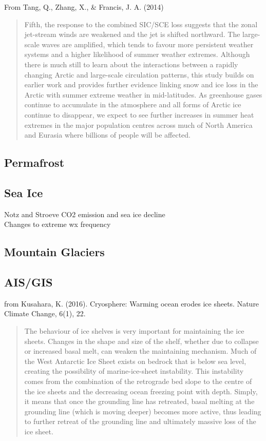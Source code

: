 \documentclass[amstex,12pt]{book}
\begin{document}
From Tang, Q., Zhang, X., \& Francis, J. A. (2014) 
\begin{quotation}
	Fifth, the response to the combined SIC/SCE loss suggests that the zonal jet-stream winds are weakened and the jet is shifted northward. The large-scale waves are amplified, which tends to favour more persistent weather systems and a higher likelihood of summer weather extremes. Although there is much still to learn about the interactions between a rapidly changing Arctic and large-scale circulation patterns, this study builds on earlier work and provides further evidence linking snow and ice loss in the Arctic with summer extreme weather in mid-latitudes. As greenhouse gases continue to accumulate in the atmosphere and all forms of Arctic ice continue to disappear, we expect to see further increases in summer heat extremes in the major population centres across much of North America and Eurasia where billions of people will be affected.
\end{quotation}


\subsection{Permafrost}
\subsection{Sea Ice}
Notz and Stroeve CO2 emission and sea ice decline\\
Changes to extreme wx frequency\\
\subsection{Mountain Glaciers}
\subsection{AIS/GIS}
from Kusahara, K. (2016). Cryosphere: Warming ocean erodes ice sheets. Nature Climate Change, 6(1), 22. \begin{quotation}
	The behaviour of ice shelves is very important for maintaining the ice sheets. Changes in the shape and size of the shelf, whether due to collapse or increased basal melt, can weaken the maintaining mechanism. Much of the West Antarctic Ice Sheet exists on bedrock that is below sea level, creating the possibility of marine-ice-sheet instability. This instability comes from the combination of the retrograde bed slope to the centre of the ice sheets and the decreasing ocean freezing point with depth. Simply, it means that once the grounding line has retreated, basal melting at the grounding line (which is moving deeper) becomes more active, thus leading to further retreat of the grounding line and ultimately massive loss of the ice sheet.
\end{quotation}
\end{document}
